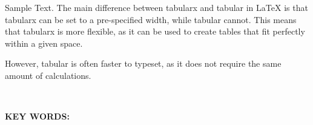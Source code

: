 \thispagestyle{plain}    %

Sample Text. The main difference between tabularx and tabular in LaTeX is that tabularx can be set to a pre-specified width, while tabular cannot. This means that tabularx is more flexible, as it can be used to create tables that fit perfectly within a given space.

However, tabular is often faster to typeset, as it does not require the same amount of calculations.

\

\noindent
\textbf{KEY WORDS: }
